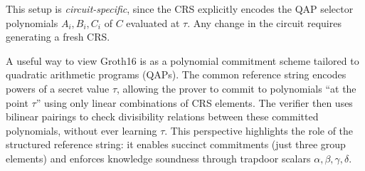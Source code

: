 \noindent
This setup is \emph{circuit-specific}, since the CRS explicitly encodes 
the QAP selector polynomials $A_i,B_i,C_i$ of $C$ evaluated at $\tau$.  
Any change in the circuit requires generating a fresh CRS.

\myspace

\begin{remark}
A useful way to view Groth16 is as a polynomial commitment scheme
tailored to quadratic arithmetic programs (QAPs). 
The common reference string encodes powers of a secret value $\tau$, 
allowing the prover to commit to polynomials ``at the point $\tau$'' 
using only linear combinations of CRS elements. 
The verifier then uses bilinear pairings to check divisibility relations 
between these committed polynomials, without ever learning $\tau$. 
This perspective highlights the role of the structured reference string: 
it enables succinct commitments (just three group elements) and 
enforces knowledge soundness through trapdoor scalars 
$\alpha, \beta, \gamma, \delta$. 
\end{remark}

\myspace

